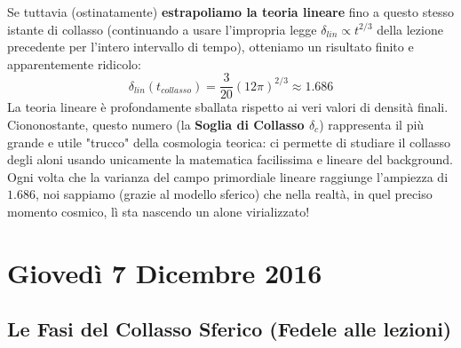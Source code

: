 \documentclass[11pt,a4paper]{report}
\begin{document}
Se tuttavia (ostinatamente) \textbf{estrapoliamo la teoria lineare} fino a questo stesso istante di collasso (continuando a usare l'impropria legge $\delta_{lin} \propto t^{2/3}$ della lezione precedente per l'intero intervallo di tempo), otteniamo un risultato finito e apparentemente ridicolo:
\begin{equation}
\delta_{lin}(t_{collasso}) = \frac{3}{20} (12\pi)^{2/3} \approx 1.686
\end{equation}
La teoria lineare è profondamente sballata rispetto ai veri valori di densità finali. Ciononostante, questo numero (la \textbf{Soglia di Collasso $\delta_c$}) rappresenta il più grande e utile "trucco" della cosmologia teorica: ci permette di studiare il collasso degli aloni usando unicamente la matematica facilissima e lineare del background. Ogni volta che la varianza del campo primordiale lineare raggiunge l'ampiezza di $1.686$, noi sappiamo (grazie al modello sferico) che nella realtà, in quel preciso momento cosmico, lì sta nascendo un alone virializzato!

\chapter{Giovedì 7 Dicembre 2016}

\section{Le Fasi del Collasso Sferico (Fedele alle lezioni)}
\end{document}
